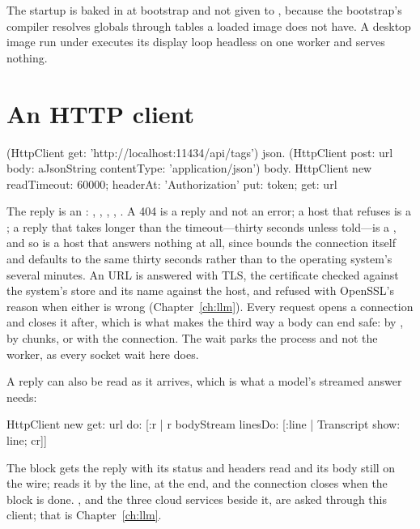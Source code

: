 \begin{stnote}
The startup is baked in at bootstrap and not given to , because
the bootstrap's compiler resolves globals through tables a loaded image does
not have. A desktop image run under  executes its display loop
headless on one worker and serves nothing.
\end{stnote}

\section{An HTTP client}

\begin{st}
(HttpClient get: 'http://localhost:11434/api/tags') json.
(HttpClient post: url body: aJsonString contentType: 'application/json') body.
HttpClient new readTimeout: 60000; headerAt: 'Authorization' put: token; get: url
\end{st}

The reply is an : , ,
, , . A 404 is a reply and not an error;
a host that refuses is a ; a reply that takes longer than the
timeout---thirty seconds unless told---is a , and so is a host
that answers nothing at all, since  bounds the
connection itself and defaults to the same thirty seconds rather than to
the operating system's several minutes. An 
URL is answered with TLS, the certificate checked against the system's
store and its name against the host, and refused with OpenSSL's reason when
either is wrong (Chapter~\ref{ch:llm}). Every request opens a connection
and closes it after, which is what makes the third way a body can end safe:
by , by chunks, or with the connection. The wait parks
the process and not the worker, as every socket wait here does.

A reply can also be read as it arrives, which is what a model's streamed
answer needs:

\begin{st}
HttpClient new get: url do: [:r | r bodyStream linesDo: [:line | Transcript show: line; cr]]
\end{st}

The block gets the reply with its status and headers read and its body
still on the wire;  reads it by the line,  at the
end, and the connection closes when the block is done. , and the
three cloud services beside it, are asked through this client; that is
Chapter~\ref{ch:llm}.

